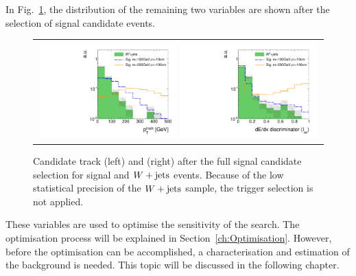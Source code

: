 In Fig.~\ref{fig:PtAndIasAfterFullPreselection}, the distribution of the remaining two variables are shown after the selection of signal candidate events.
\begin{figure}[!h]
  \centering 
  \begin{tabular}{c}
    \includegraphics[width=0.49\textwidth]{figures/analysis_2/AnalysisSelection/chiTracksfullSelectionNoTriggerCuts_Wjets/htrackPtSmallRangeCoarseBinning_log.pdf}
    \includegraphics[width=0.49\textwidth]{figures/analysis_2/AnalysisSelection/chiTracksfullSelectionNoTriggerCuts_Wjets/htrackASmiSmallRange_log.pdf}
  \end{tabular}
  \caption{Candidate track \pt (left) and \ias (right) after the full signal candidate selection for signal and $W+\text{jets}$ events. 
           Because of the low statistical precision of the $W+\text{jets}$ sample, the trigger selection is not applied.
           }
  \label{fig:PtAndIasAfterFullPreselection}
\end{figure}
These variables are used to optimise the sensitivity of the search.
The optimisation process will be explained in Section~\ref{ch:Optimisation}.
However, before the optimisation can be accomplished, a characterisation and estimation of the background is needed.
This topic will be discussed in the following chapter.




